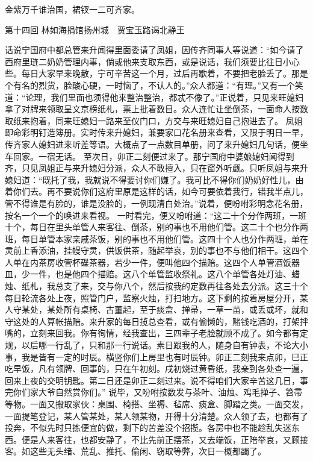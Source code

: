 \documentclass[12pt,oneside]{book}
\begin{document}
金紫万千谁治国，裙钗一二可齐家。
 
第十四回  林如海捐馆扬州城　贾宝玉路谒北静王


话说宁国府中都总管来升闻得里面委请了凤姐，因传齐同事人等说道：“如今请了西府里琏二奶奶管理内事，倘或他来支取东西，或是说话，我们须要比往日小心些。每日大家早来晚散，宁可辛苦这一个月，过后再歇着，不要把老脸丢了。那是个有名的烈货，脸酸心硬，一时恼了，不认人的。”众人都道：“有理。”又有一个笑道：“论理，我们里面也须得他来整治整治，都忒不像了。”正说着，只见来旺媳妇拿了对牌来领取呈文京榜纸札，票上批着数目。众人连忙让坐倒茶，一面命人按数取纸来抱着，同来旺媳妇一路来至仪门口，方交与来旺媳妇自己抱进去了。
凤姐即命彩明钉造簿册。实时传来升媳妇，兼要家口花名册来查看，又限于明日一早，传齐家人媳妇进来听差等语。大概点了一点数目单册，问了来升媳妇几句话，便坐车回家。一宿无话。
至次日，卯正二刻便过来了。那宁国府中婆娘媳妇闻得到齐，只见凤姐正与来升媳妇分派，众人不敢擅入，只在窗外听觑。只听凤姐与来升媳妇道：“既托了我，我就说不得要讨你们嫌了。我可比不得你们奶奶好性儿，由着你们去。再不要说你们这府里原是这样的话，如今可要依着我行，错我半点儿，管不得谁是有脸的，谁是没脸的，一例现清白处治。”说着，便吩咐彩明念花名册，按名一个一个的唤进来看视。
一时看完，便又吩咐道：“这二十个分作两班，一班十个，每日在里头单管人来客往、倒茶，别的事也不用他们管。这二十个也分作两班，每日单管本家亲戚茶饭，别的事也不用他们管。这四十个人也分作两班，单在灵前上香添油，挂幔守灵，供饭供茶，随起举哀，别的事也不与他们相干。这四个人单在内茶房收管杯碟茶器，若少一件，便叫他四个描赔。这四个人单管酒饭器皿，少一件，也是他四个描赔。这八个单管监收祭礼。这八个单管各处灯油、蜡烛、纸札，我总支了来，交与你八个，然后按我的定数再往各处去分派。这三十个每日轮流各处上夜，照管门户，监察火烛，打扫地方。这下剩的按着房屋分开，某人守某处，某处所有桌椅、古董起，至于痰盒、掸帚，一草一苗，或丢或坏，就和守这处的人算帐描赔。来升家的每日揽总查看，或有偷懒的，赌钱吃酒的，打架拌嘴的，立刻来回我。你有徇情，经我查出，三四辈子老脸就顾不成了。如今都有定规，以后哪一行乱了，只和那一行说话。素日跟我的人，随身自有钟表，不论大小事，我是皆有一定的时辰。横竖你们上房里也有时辰钟。卯正二刻我来点卯，巳正吃早饭，凡有领牌、回事的，只在午初刻。戌初烧过黄昏纸，我亲到各处查一遍，回来上夜的交明钥匙。第二日还是卯正二刻过来。说不得咱们大家辛苦这几日，事完你们家大爷自然赏你们。”
说毕，又吩咐按数发与茶叶、油烛、鸡毛掸子、笤帚等物。一面又搬取家伙：桌围、椅搭、坐褥、毡席、痰盒、脚踏之类。一面交发，一面提笔登记，某人管某处，某人领某物，开得十分清楚。众人领了去，也都有了投奔，不似先时只拣便宜的做，剩下的苦差没个招揽。各房中也不能趁乱失迷东西。便是人来客往，也都安静了，不比先前正摆茶，又去端饭，正陪举哀，又顾接客。如这些无头绪、荒乱、推托、偷闲、窃取等弊，次日一概都蠲了。
\end{document}
